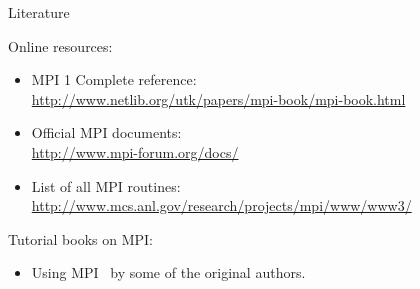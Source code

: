  {Literature}

Online resources:
\begin{itemize}
\item MPI 1 Complete reference:\\ \url{http://www.netlib.org/utk/papers/mpi-book/mpi-book.html}
\item Official MPI documents:\\ \url{http://www.mpi-forum.org/docs/}
\item List of all MPI routines:\\ \url{http://www.mcs.anl.gov/research/projects/mpi/www/www3/}
\end{itemize}

Tutorial books on MPI:
\begin{itemize}
\item Using MPI~\cite{Gropp:UsingMPI1} by some of the original authors.
\end{itemize}

\endinput

Examples: 
compute pi
mandelbrot set
